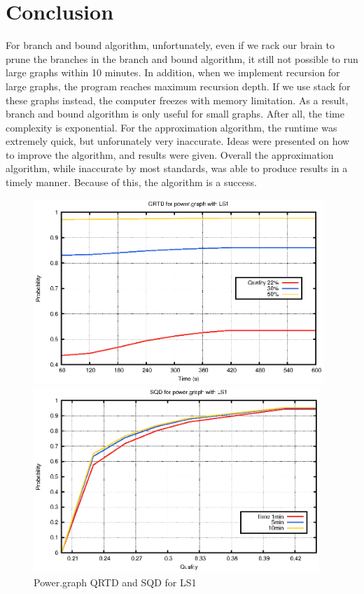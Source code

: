 \section{Conclusion}
For branch and bound algorithm, unfortunately, even if we rack our brain to prune the branches in the branch and bound algorithm, it still not possible to run large graphs within 10 minutes. In addition, when we implement recursion for large graphs, the program reaches maximum recursion depth. If we use stack for these graphs instead, the computer freezes with memory limitation. As a result, branch and bound algorithm is only useful for small graphs. After all, the time complexity is exponential.
For the approximation algorithm, the runtime was extremely quick, but unforunately very inaccurate. Ideas were presented on how to improve the algorithm, and results were given. Overall the approximation algorithm, while inaccurate by most standards, was able to produce results in a timely manner. Because of this, the algorithm is a success. 

\begin{figure}[H]
\centering
\caption{Power.graph QRTD and SQD for LS1}
\begin{minipage}[b]{0.4\textwidth}
\includegraphics[height=7cm]{../graph/power-QRTD-LS1.eps}
\end{minipage}
\hspace{0.6in}
\begin{minipage}[b]{0.4\textwidth}
\centering
\includegraphics[height=7cm]{../graph/power-SQD-LS1.eps}
\end{minipage}
\end{figure}

